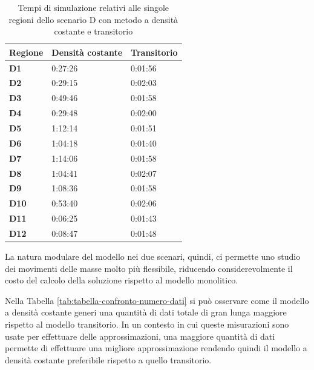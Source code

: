 \begin{table}[h]
  \centering
  \resizebox{0.7\textwidth}{!} {
 \begin{tabular}[t]{ |l|l|l| }
	 	\hline
	\textbf{Regione}	&		\textbf{Densità costante}	&		\textbf{Transitorio}	\\ \hline
	\textbf{D1} 	 &		0:27:26					&		0:01:56		\\ \hline
	\textbf{D2}		 &		0:29:15 				&		0:02:03		\\ \hline
	\textbf{D3}		 &		0:49:46 				&		0:01:58		\\ \hline
	\textbf{D4}		 &		0:29:48 				&		0:02:00		\\ \hline
	\textbf{D5}		 &		1:12:14 				&		0:01:51		\\ \hline
	\textbf{D6}		 &		1:04:18 				&		0:01:40		\\ \hline
	\textbf{D7}		 &		1:14:06 				&		0:01:58		\\ \hline
	\textbf{D8}		 &		1:04:41 				&		0:02:07		\\ \hline
	\textbf{D9}		 &		1:08:36 				&		0:01:58		\\ \hline
	\textbf{D10}	 &		0:53:40 				&		0:02:06		\\ \hline
	\textbf{D11}	 &		0:06:25 				&		0:01:43		\\ \hline
	\textbf{D12}	 &		0:08:47 				&		0:01:48		\\ \hline
	
	
  \end{tabular}
  
  }
  \caption{Tempi di simulazione relativi alle singole regioni dello scenario D con metodo a densità costante e transitorio}
  \label{tab:tabella-dati-simulazioni-D}
\end{table}
 
La natura modulare del modello nei due scenari, quindi, ci permette uno studio dei movimenti delle masse molto più flessibile, riducendo considerevolmente il costo del calcolo della soluzione rispetto al modello monolitico.

Nella Tabella \ref{tab:tabella-confronto-numero-dati} si può osservare come il modello a densità costante generi una quantità di dati totale di gran lunga maggiore rispetto al modello transitorio. In un contesto in cui queste misurazioni sono usate per effettuare delle approssimazioni, una maggiore quantità di dati permette di effettuare una migliore approssimazione rendendo quindi il modello a densità costante preferibile rispetto a quello transitorio.

